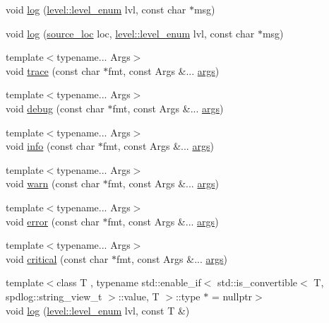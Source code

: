 \begin{DoxyCompactItemize}
\item 
void \hyperlink{classspdlog_1_1logger_ae59d1c2d5b3a4cc4807534c73b46f297}{log} (\hyperlink{namespacespdlog_1_1level_a35f5227e5daf228d28a207b7b2aefc8b}{level\+::level\+\_\+enum} lvl, const char $\ast$msg)
\item 
void \hyperlink{classspdlog_1_1logger_abf7d5c94e0c295aa2e55e1139b787a57}{log} (\hyperlink{structspdlog_1_1source__loc}{source\+\_\+loc} loc, \hyperlink{namespacespdlog_1_1level_a35f5227e5daf228d28a207b7b2aefc8b}{level\+::level\+\_\+enum} lvl, const char $\ast$msg)
\item 
{\footnotesize template$<$typename... Args$>$ }\\void \hyperlink{classspdlog_1_1logger_a59a8516fe055c6b78c9b1822148f78ec}{trace} (const char $\ast$fmt, const Args \&... \hyperlink{printf_8h_a47047b7b28fd1342eef756b79c778580}{args})
\item 
{\footnotesize template$<$typename... Args$>$ }\\void \hyperlink{classspdlog_1_1logger_a1f60afc8308e0127c2eab2619ae352d5}{debug} (const char $\ast$fmt, const Args \&... \hyperlink{printf_8h_a47047b7b28fd1342eef756b79c778580}{args})
\item 
{\footnotesize template$<$typename... Args$>$ }\\void \hyperlink{classspdlog_1_1logger_a72f80c2e379df565c628adab1efdab34}{info} (const char $\ast$fmt, const Args \&... \hyperlink{printf_8h_a47047b7b28fd1342eef756b79c778580}{args})
\item 
{\footnotesize template$<$typename... Args$>$ }\\void \hyperlink{classspdlog_1_1logger_aa1027cf4e4d6fd7fcf361534affe7bdc}{warn} (const char $\ast$fmt, const Args \&... \hyperlink{printf_8h_a47047b7b28fd1342eef756b79c778580}{args})
\item 
{\footnotesize template$<$typename... Args$>$ }\\void \hyperlink{classspdlog_1_1logger_a144338f88fd2d2bec2cae951e214a9a5}{error} (const char $\ast$fmt, const Args \&... \hyperlink{printf_8h_a47047b7b28fd1342eef756b79c778580}{args})
\item 
{\footnotesize template$<$typename... Args$>$ }\\void \hyperlink{classspdlog_1_1logger_a3d11416764fe7ead94868d4c6438f583}{critical} (const char $\ast$fmt, const Args \&... \hyperlink{printf_8h_a47047b7b28fd1342eef756b79c778580}{args})
\item 
{\footnotesize template$<$class T , typename std\+::enable\+\_\+if$<$ std\+::is\+\_\+convertible$<$ T, spdlog\+::string\+\_\+view\+\_\+t $>$\+::value, T $>$\+::type $\ast$  = nullptr$>$ }\\void \hyperlink{classspdlog_1_1logger_a706ca9501457bdda5562cf0dffeca712}{log} (\hyperlink{namespacespdlog_1_1level_a35f5227e5daf228d28a207b7b2aefc8b}{level\+::level\+\_\+enum} lvl, const T \&)

\end{DoxyCompactItemize}
